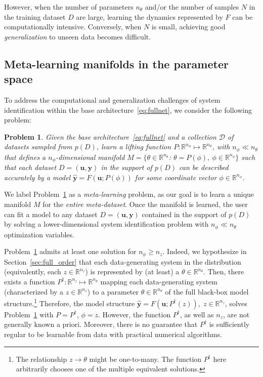 \documentclass{article}
\newcommand{\seq}[1]{{\mathbf{#1}}}
\newcommand{\R}{\mathbb{R}}
\newcommand{\DD}{\mathcal{D}}
\newcommand{\latent}{z}
\newcommand{\fullpar}{\theta}
\newcommand{\redpar}{\phi}
\newcommand{\M}{F}
\newtheorem{problem}{Problem}
\begin{document}
However, when the number of parameters $n_\fullpar$ and/or the number of samples $N$ in the training dataset $D$ are large, learning the dynamics represented by $\M$ can be computationally intensive. Conversely, when $N$ is small, achieving good {\it generalization} to unseen data becomes difficult.

\subsection{Meta-learning manifolds in the parameter space}
To address the computational and generalization challenges of system identification within the base architecture~\eqref{eq:fullnet}, we consider the following problem:
\begin{problem}
Given  the base architecture~\eqref{eq:fullnet} and a collection $\DD$ of datasets sampled from $p(D)$,
learn a lifting function $P: \R^{n_\redpar} \mapsto \R^{n_\fullpar}$, with $n_\redpar \ll n_\fullpar$ that defines a $n_\redpar$-dimensional manifold $M=\{\fullpar\in\R^{n_\fullpar}$: $\fullpar=P(\redpar),\ \redpar \in \R^{n_\redpar}\}$
such that each dataset $D=(\seq{u},\seq{y})$ in the support of $p(D)$ can be described accurately by a model $\hat{\seq{y}}=\M(\seq{u};P(\redpar))$ for some coordinate vector $\redpar\in\R^{n_\redpar}$.
\label{prob:manifold}
\end{problem}
We label Problem~\ref{prob:manifold} as a \emph{meta-learning} problem, as our goal is to learn a unique manifold $M$ for the {\it entire meta-dataset}. Once the manifold is learned, the user can fit a model to any dataset $D=(\seq{u},\seq{y})$ contained in the support of $p(D)$ by solving a lower-dimensional system identification problem with
$n_\redpar \ll n_\fullpar$ optimization variables.

Problem~\ref{prob:manifold} admits at least one solution for $n_\redpar \geq n_\latent$. Indeed, we
hypothesize in Section~\ref{sec:full_order} that each data-generating system in the distribution (equivalently, each $\latent \in \R^{n_\latent}$) is represented by (at least) a $\fullpar \in \R^{n_\fullpar}$. Then, there exists a function $P^\dagger : \R^{n_\latent} \mapsto \R^{n_\fullpar}$ mapping each data-generating system (characterized by a $\latent \in \R^{n_\latent}$) to a parameter $\fullpar \in \R^{n_\fullpar}$ of the full black-box model structure.\footnote{The relationship $\latent \rightarrow \fullpar$ might be one-to-many. The function $P^\dagger$ here arbitrarily chooses one of the multiple equivalent solutions.}
Therefore, the model structure
$\hat {\seq{y}} = \M(\seq{u}; P^\dagger(\latent)),\;  \latent \in \R^{n_\latent}$, solves Problem~\ref{prob:manifold}
with $P=P^\dagger$, $\redpar=\latent$. However, the function $P^\dagger$, as well as $n_\latent$, are not generally known a priori.
Moreover, there is no guarantee that $P^\dagger$ is sufficiently regular to be learnable from data with practical numerical algorithms.
\end{document}
